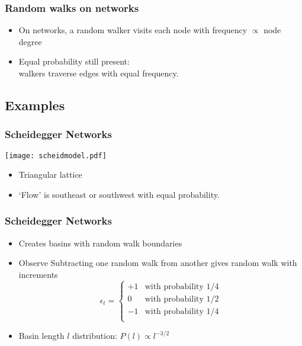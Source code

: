 
\begin{frame}
  \frametitle{Random walks on networks}
  
  \begin{itemize}
  \item <1->
    On networks, a random walker visits each node
    with frequency $\propto$ node degree
  \item <2->
    Equal probability still present:\\
    walkers traverse
    \alert{edges} with equal frequency.
  \end{itemize}

\end{frame}



%   
%



\subsection{Examples}

\begin{frame}
  \frametitle{Scheidegger Networks\cite{scheidegger1967b,dodds2000a}}
  \texttt{[image: scheidmodel.pdf]}
  \begin{itemize}
  \item Triangular lattice
  \item `Flow' is southeast or southwest with equal probability.
  \end{itemize}

\end{frame}

\begin{frame}
  \frametitle{Scheidegger Networks}

  \begin{itemize}
  \item <1->
    Creates basins with random walk boundaries
  \item <2->
    \alert{Observe} Subtracting one random walk from another
    gives random walk with increments
    $$
    \epsilon_t = 
    \left\{
      \begin{array}{cl}
        +1 & \mbox{with probability $1/4$} \\
        0 & \mbox{with probability $1/2$} \\
        -1 & \mbox{with probability $1/4$} \\
      \end{array}
    \right.
    $$
  \item <3->
    Basin length $l$ distribution: $P(l) \propto l^{-3/2}$
  \end{itemize}
  
\end{frame}

